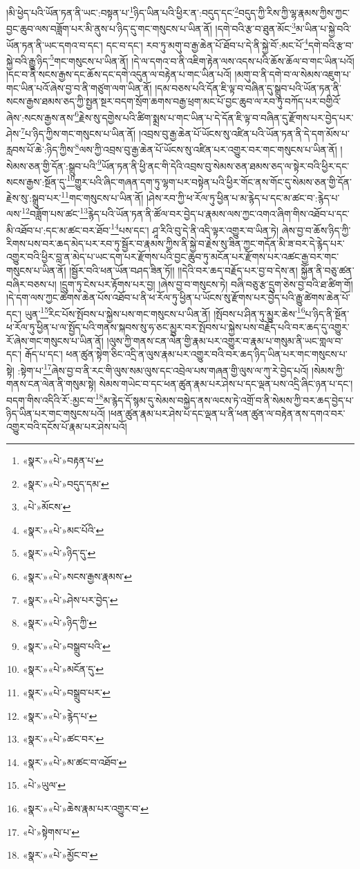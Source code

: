 །མི་ཕྱེད་པའི་ཡོན་ཏན་ནི་ཡང་:བསྟན་པ་\footnote{«སྣར་»«པེ་»བརྟན་པ་}ཉིད་ཡིན་པའི་ཕྱིར་ན་:བདུད་དང་\footnote{«སྣར་»«པེ་»བདུད་དམ་}བདུད་ཀྱི་རིས་ཀྱི་ལྷ་རྣམས་ཀྱིས་ཀྱང་བྱང་ཆུབ་ལས་བཟློག་པར་མི་ནུས་པ་ཉིད་དུ་གང་གསུངས་པ་ཡིན་ནོ། །དགེ་བའི་རྩ་བ་ཐུན་མོང་\footnote{«པེ་»མོངས་}མ་ཡིན་པ་སྐྱེ་བའི་ཡོན་ཏན་ནི་ཡང་དགའ་བ་དང་། དང་བ་དང་། རབ་ཏུ་མགུ་བ་རྒྱ་ཆེན་པོ་ཐོབ་པ་དེ་ནི་སྐྱེ་བོ་:མང་པོ་\footnote{«སྣར་»«པེ་»མང་པོའི་}དགེ་བའི་རྩ་བ་སྐྱེ་བའི་རྒྱུ་ཉིད་\footnote{«སྣར་»«པེ་»ཉིད་དུ་}གང་གསུངས་པ་ཡིན་ནོ། །དེ་ལ་དགའ་བ་ནི་འཇིག་རྟེན་ལས་འདས་པའི་ཆོས་ཆོལ་བ་གང་ཡིན་པའོ། །དང་བ་ནི་སངས་རྒྱས་དང་ཆོས་དང་དགེ་འདུན་ལ་བརྟེན་པ་གང་ཡིན་པའོ། །མགུ་བ་ནི་དགེ་བ་ལ་སེམས་འཇུག་པ་གང་ཡིན་པའོ་ཞེས་བྱ་བ་ནི་གཙུག་ལག་ཡིན་ནོ། །དམ་བཅས་པའི་དོན་ཇི་ལྟ་བ་བཞིན་དུ་སྒྲུབ་པའི་ཡོན་ཏན་ནི་སངས་རྒྱས་ཐམས་ཅད་ཀྱི་སྤྱན་སྔར་བདག་སྲོག་ཆགས་བརྒྱ་ཕྲག་མང་པོ་བྱང་ཆུབ་ལ་རབ་ཏུ་བཀོད་པར་བགྱིའོ་ཞེས་:སངས་རྒྱས་ནས་\footnote{«སྣར་»«པེ་»སངས་རྒྱས་རྣམས་}རྗེས་སུ་དགྱེས་པའི་ཚིག་སྨྲས་པ་གང་ཡིན་པ་དེ་དོན་ཇི་ལྟ་བ་བཞིན་དུ་རྫོགས་པར་བྱེད་པར་ཤེས་\footnote{«སྣར་»«པེ་»ཤེས་པར་བྱེད་}པ་ཉིད་ཀྱིས་གང་གསུངས་པ་ཡིན་ནོ། །འབྲས་བུ་རྒྱ་ཆེན་པོ་ཡོངས་སུ་འཛིན་པའི་ཡོན་ཏན་ནི་དེ་དག་མོས་པ་རླབས་པོ་ཆེ་:ཉིད་ཀྱིས་\footnote{«སྣར་»«པེ་»ཉིད་ཀྱི་}ལས་ཀྱི་འབྲས་བུ་རྒྱ་ཆེན་པོ་ཡོངས་སུ་འཛིན་པར་འགྱུར་བར་གང་གསུངས་པ་ཡིན་ནོ། །སེམས་ཅན་གྱི་དོན་:སྒྲུབ་པའི་\footnote{«སྣར་»«པེ་»བསྒྲུབ་པའི་}ཡོན་ཏན་ནི་ཕྱི་ནང་གི་དེའི་འབྲས་བུ་སེམས་ཅན་ཐམས་ཅད་ལ་སྟེར་བའི་ཕྱིར་དང་སངས་རྒྱས་:སྔོན་དུ་\footnote{«སྣར་»«པེ་»མངོན་དུ་}གྱུར་པའི་ཞིང་གཞན་དག་ཏུ་ལྷག་པར་བསྟེན་པའི་ཕྱིར་གོང་ནས་གོང་དུ་སེམས་ཅན་གྱི་དོན་རྗེས་སུ་:སྒྲུབ་པར་\footnote{«སྣར་»«པེ་»བསྒྲུབ་པར་}གང་གསུངས་པ་ཡིན་ནོ། །ཤེས་རབ་ཀྱི་ཕ་རོལ་ཏུ་ཕྱིན་པ་མ་རྙེད་པ་དང་མ་ཚང་བ་:རྙེད་པ་ལས་\footnote{«སྣར་»«པེ་»རྙེད་པ་}བཟློག་པས་ཚང་\footnote{«སྣར་»«པེ་»ཚང་བར་}རྙེད་པའི་ཡོན་ཏན་ནི་ཚོལ་བར་བྱེད་པ་རྣམས་ལས་ཀྱང་འགའ་ཞིག་གིས་འཐོབ་པ་དང་མི་འཐོབ་པ་:དང་མ་ཚང་བར་ཐོབ་\footnote{«སྣར་»«པེ་»མ་ཚང་བ་འཐོབ་}པས་དང་། ཤཱ་རིའི་བུ་དེ་ནི་འདི་ལྟར་འགྱུར་བ་ཡིན་ཏེ། ཞེས་བྱ་བ་ཆོས་ཉིད་ཀྱི་རིགས་པས་བར་ཆད་མེད་པར་རབ་ཏུ་སྦྱོར་བ་རྣམས་ཀྱིས་ནི་སྐྱེ་བ་རྗེས་སུ་ཟིན་ཀྱང་གདོན་མི་ཟ་བར་དེ་རྙེད་པར་འགྱུར་བའི་ཕྱིར་བླ་ན་མེད་པ་ཡང་དག་པར་རྫོགས་པའི་བྱང་ཆུབ་ཏུ་མངོན་པར་རྫོགས་པར་འཚང་རྒྱ་བར་གང་གསུངས་པ་ཡིན་ནོ། །སྦྱོར་བའི་ཕན་ཡོན་བཤད་ཟིན་ཏོ།། །།དེའི་བར་ཆད་བརྗོད་པར་བྱ་བ་དེས་ན། སྐྱོན་ནི་བཅུ་ཚན་བཞིར་བཅས་པ། །དྲུག་ཏུ་ངེས་པར་རྟོགས་པར་བྱ། །ཞེས་བྱ་བ་གསུངས་ཏེ། བཞི་བཅུ་རྩ་དྲུག་ཅེས་བྱ་བའི་ཐ་ཚིག་གོ། །དེ་དག་ལས་ཀྱང་ཚེགས་ཆེན་པོས་འཐོབ་པ་ནི་ཕ་རོལ་ཏུ་ཕྱིན་པ་ཡོངས་སུ་རྫོགས་པར་བྱེད་པའི་རྒྱུ་ཚེགས་ཆེན་པོ་དང་། ཡུན་\footnote{«པེ་»ཡུལ་}རིང་པོས་སྤོབས་པ་སྐྱེས་པས་གང་གསུངས་པ་ཡིན་ནོ། །སྤོབས་པ་ཤིན་ཏུ་མྱུར་ཆེས་\footnote{«སྣར་»«པེ་»ཆེས་རྣམ་པར་འགྱུར་བ་}པ་ཉིད་ནི་སྔོན་ཕ་རོལ་ཏུ་ཕྱིན་པ་ལ་སྤྱོད་པའི་གནས་སྐབས་སུ་ཧ་ཅང་མྱུར་བར་སྤོབས་པ་སྐྱེས་པས་བརྗོད་པའི་བར་ཆད་དུ་འགྱུར་རོ་ཞེས་གང་གསུངས་པ་ཡིན་ནོ། །ལུས་ཀྱི་གནས་ངན་ལེན་གྱི་རྣམ་པར་འགྱུར་བ་རྣམ་པ་གསུམ་ནི་ཡང་གླལ་བ་དང་། རྒོད་པ་དང་། ཕན་ཚུན་སྟེག་ཅིང་འདྲི་ན་ལུས་རྣམ་པར་འགྱུར་བའི་བར་ཆད་ཉིད་ཡིན་པར་གང་གསུངས་པ་སྟེ། :སྟེག་པ་\footnote{«པེ་»སྟེགས་པ་}ཞེས་བྱ་བ་ནི་རང་གི་ལུས་སམ་ལུས་དང་འབྲེལ་པས་གཞན་གྱི་ལུས་ལ་ཀུ་རེ་བྱེད་པའོ། །སེམས་ཀྱི་གནས་ངན་ལེན་ནི་གསུམ་སྟེ། སེམས་གཡེང་བ་དང་ཕན་ཚུན་རྣམ་པར་ཤེས་པ་དང་ལྡན་པས་འདྲི་ཞིང་ཉན་པ་དང་། བདག་གིས་འདིའི་རོ་:མྱང་བ་\footnote{«སྣར་»«པེ་»མྱོང་བ་}མ་རྙེད་དོ་སྙམ་དུ་སེམས་བསྐྱེད་ནས་ལངས་ཏེ་འགྲོ་བ་ནི་སེམས་ཀྱི་བར་ཆད་བྱེད་པ་ཉིད་ཡིན་པར་གང་གསུངས་པའོ། །ཕན་ཚུན་རྣམ་པར་ཤེས་པ་དང་ལྡན་པ་ནི་ཕན་ཚུན་ལ་བརྟེན་ནས་དགའ་བར་འགྱུར་བའི་དངོས་པོ་རྣམ་པར་ཤེས་པའོ། 